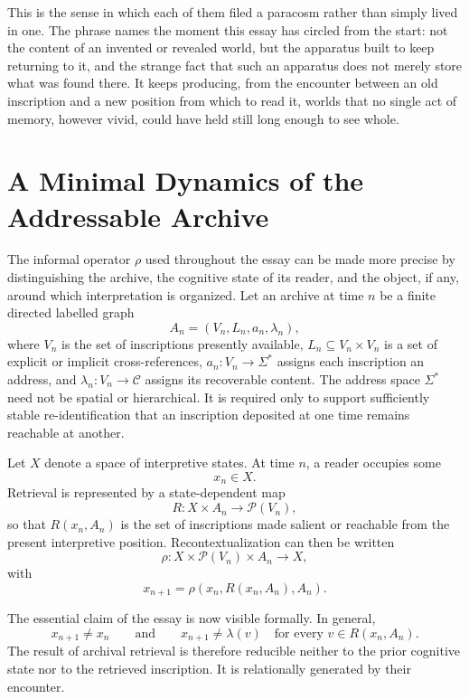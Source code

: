\documentclass[11pt]{article}
\begin{document}
This is the sense in which each of them filed a paracosm rather than simply lived in one. The phrase names the moment this essay has circled from the start: not the content of an invented or revealed world, but the apparatus built to keep returning to it, and the strange fact that such an apparatus does not merely store what was found there. It keeps producing, from the encounter between an old inscription and a new position from which to read it, worlds that no single act of memory, however vivid, could have held still long enough to see whole.

\clearpage
\appendix

\section{A Minimal Dynamics of the Addressable Archive}

The informal operator $\rho$ used throughout the essay can be made more precise by distinguishing the archive, the cognitive state of its reader, and the object, if any, around which interpretation is organized. Let an archive at time $n$ be a finite directed labelled graph
\[
A_n = (V_n, L_n, a_n, \lambda_n),
\]
where $V_n$ is the set of inscriptions presently available, $L_n \subseteq V_n \times V_n$ is a set of explicit or implicit cross-references, $a_n : V_n \to \Sigma^\ast$ assigns each inscription an address, and $\lambda_n : V_n \to \mathcal{C}$ assigns its recoverable content. The address space $\Sigma^\ast$ need not be spatial or hierarchical. It is required only to support sufficiently stable re-identification that an inscription deposited at one time remains reachable at another.

Let $X$ denote a space of interpretive states. At time $n$, a reader occupies some
\[
x_n \in X.
\]
Retrieval is represented by a state-dependent map
\[
R : X \times A_n \longrightarrow \mathcal{P}(V_n),
\]
so that $R(x_n, A_n)$ is the set of inscriptions made salient or reachable from the present interpretive position. Recontextualization can then be written
\[
\rho : X \times \mathcal{P}(V_n) \times A_n \longrightarrow X,
\]
with
\[
x_{n+1} = \rho\!\left(x_n, R(x_n, A_n), A_n\right).
\]

The essential claim of the essay is now visible formally. In general,
\[
x_{n+1} \neq x_n
\qquad \text{and} \qquad
x_{n+1} \neq \lambda(v) \quad \text{for every } v \in R(x_n, A_n).
\]
The result of archival retrieval is therefore reducible neither to the prior cognitive state nor to the retrieved inscription. It is relationally generated by their encounter.
\end{document}

